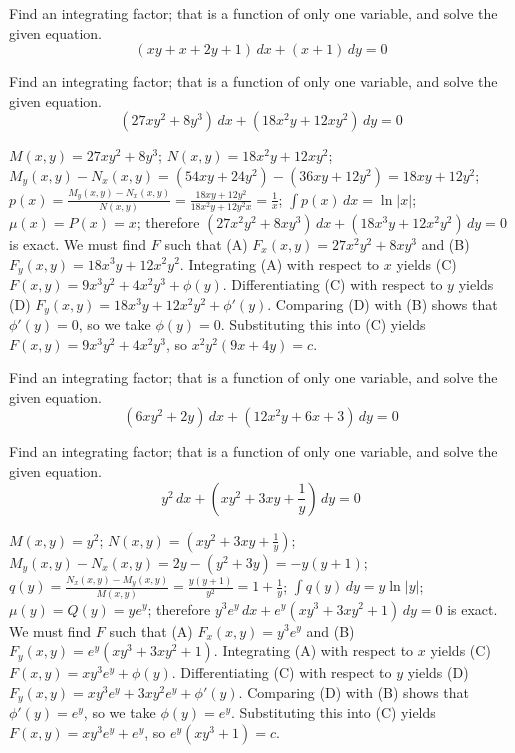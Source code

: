 \documentclass{ximera}
\begin{document}
\begin{problem}\label{exer:2.6.7} Find an integrating factor; that is a function of only one variable, and solve the given equation.
$$(xy+x+2y+1)\,dx+(x+1)\,dy=0$$
\end{problem}

\begin{problem}\label{exer:2.6.8} Find an integrating factor; that is a function of only one variable, and solve the given equation.
$$(27xy^2+8y^3)\,dx+(18x^2y+12xy^2)\,dy=0$$



\begin{solution}
    $M(x,y)=27xy^2+8y^3$;\;
$N(x,y)=18x^2y+12xy^2$;\;
$M_y(x,y)-N_x(x,y)=(54xy+24y^2)-(36xy+12y^2)=18xy+12y^2$;\;
$p(x)=\frac{M_y(x,y)-N_x(x,y)}{ N(x,y)}=\frac{18xy+12y^2}{
18x^2y+12y^2x}=\frac{1}{ x}$;\;
$\int p(x)\,dx=\ln|x|$;\;
$\mu(x)=P(x)=x$;
therefore
$(27x^2y^2+8xy^3)\,dx+(18x^3y+12x^2y^2)\,dy=0$
is exact.
We must find $F$ such that
(A) $F_x(x,y)=27x^2y^2+8xy^3$ and
(B) $F_y(x,y)=18x^3y+12x^2y^2$.
Integrating (A) with respect to $x$ yields
(C) $F(x,y)=9x^3y^2+4x^2y^3+\phi(y)$.
Differentiating (C) with respect to $y$  yields
(D) $F_y(x,y)=18x^3y+12x^2y^2+\phi'(y)$.
Comparing (D) with (B)  shows that
$\phi'(y)=0$, so we take
$\phi(y)=0$.
Substituting this into (C) yields
$F(x,y)=9x^3y^2+4x^2y^3$,
so $x^2y^2(9x+4y)=c$.
\end{solution}
\end{problem}

\begin{problem}\label{exer:2.6.9} Find an integrating factor; that is a function of only one variable, and solve the given equation.
$$(6xy^2+2y)\,dx+(12x^2y+6x+3)\,dy=0$$
\end{problem}

\begin{problem}\label{exer:2.6.10} Find an integrating factor; that is a function of only one variable, and solve the given equation.
$$y^2\,dx+\left(xy^2+3xy+\frac{1}{y}\right)\,dy=0$$



\begin{solution}
    $M(x,y)=y^2$;\;
$N(x,y)= \left(xy^2+3xy+\frac{1}{ y}\right)$;\;
$M_y(x,y)-N_x(x,y)=2y-(y^2+3y)=-y(y+1)$;\;
$q(y)=\frac{N_x(x,y)-M_y(x,y)}{ M(x,y)}=\frac{y(y+1)}{ y^2}=
1+\frac{1}{ y}$;\;
$\int q(y)\,dy=y\ln|y|$;\;
$\mu(y)=Q(y)=ye^y$;
therefore
$y^3e^y\,dx+e^y(xy^3+3xy^2+1)\,dy=0$
is exact.
We must find $F$ such that
(A) $F_x(x,y)=y^3e^y$ and
(B) $F_y(x,y)=e^y(xy^3+3xy^2+1)$.
Integrating (A) with respect to $x$ yields
(C) $F(x,y)=xy^3e^y+\phi(y)$.
Differentiating (C) with respect to $y$  yields
(D) $F_y(x,y)=xy^3e^y+3xy^2e^y+\phi'(y)$.
Comparing (D) with (B)  shows that
$\phi'(y)=e^y$, so we take
$\phi(y)=e^y$.
Substituting this into (C) yields
$F(x,y)=xy^3e^y+e^y$,
so $e^y(xy^3+1)=c$.
\end{solution}
\end{problem}
\end{document}
